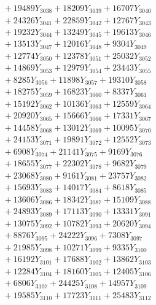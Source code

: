 \documentclass[a4paper,10pt]{article}
\begin{document}
{\begin{align}
&\;  + 19489 Y_{3038} + 18209 Y_{3039} + 16707 Y_{3040} \\[0.3ex]
&\;  + 24326 Y_{3041} + 22859 Y_{3042} + 12767 Y_{3043} \\[0.3ex]
&\;  + 19232 Y_{3044} + 13249 Y_{3045} + 19613 Y_{3046} \\[0.3ex]
&\;  + 13513 Y_{3047} + 12016 Y_{3048} + 9304 Y_{3049} \\[0.3ex]
&\;  + 12774 Y_{3050} + 12378 Y_{3051} + 25032 Y_{3052} \\[0.3ex]
&\;  + 14869 Y_{3053} + 12979 Y_{3054} + 23443 Y_{3055} \\[0.3ex]
&\;  + 8285 Y_{3056} + 11898 Y_{3057} + 19310 Y_{3058} \\[0.5ex]\allowbreak
&\;  + 18275 Y_{3059} + 16823 Y_{3060} + 8337 Y_{3061} \\[0.3ex]
&\;  + 15192 Y_{3062} + 10136 Y_{3063} + 12559 Y_{3064} \\[0.3ex]
&\;  + 20920 Y_{3065} + 15666 Y_{3066} + 17331 Y_{3067} \\[0.3ex]
&\;  + 14458 Y_{3068} + 13012 Y_{3069} + 10095 Y_{3070} \\[0.3ex]
&\;  + 24153 Y_{3071} + 19891 Y_{3072} + 12552 Y_{3073} \\[0.3ex]
&\;  + 6908 Y_{3074} + 21141 Y_{3075} + 9169 Y_{3076} \\[0.3ex]
&\;  + 18655 Y_{3077} + 22302 Y_{3078} + 9682 Y_{3079} \\[0.3ex]
&\;  + 23068 Y_{3080} + 9161 Y_{3081} + 23757 Y_{3082} \\[0.3ex]
&\;  + 15693 Y_{3083} + 14017 Y_{3084} + 8618 Y_{3085} \\[0.3ex]
&\;  + 13606 Y_{3086} + 18342 Y_{3087} + 15109 Y_{3088} \\[0.5ex]\allowbreak
&\;  + 24893 Y_{3089} + 17113 Y_{3090} + 13331 Y_{3091} \\[0.3ex]
&\;  + 13075 Y_{3092} + 10782 Y_{3093} + 20620 Y_{3094} \\[0.3ex]
&\;  + 8876 Y_{3095} + 24222 Y_{3096} + 7308 Y_{3097} \\[0.3ex]
&\;  + 21985 Y_{3098} + 10271 Y_{3099} + 9335 Y_{3100} \\[0.3ex]
&\;  + 16192 Y_{3101} + 17688 Y_{3102} + 13862 Y_{3103} \\[0.3ex]
&\;  + 12284 Y_{3104} + 18160 Y_{3105} + 12405 Y_{3106} \\[0.3ex]
&\;  + 6806 Y_{3107} + 24425 Y_{3108} + 14957 Y_{3109} \\[0.3ex]
&\;  + 19585 Y_{3110} + 17723 Y_{3111} + 25483 Y_{3112} \\[0.3ex]

\end{align}}
\end{document}
